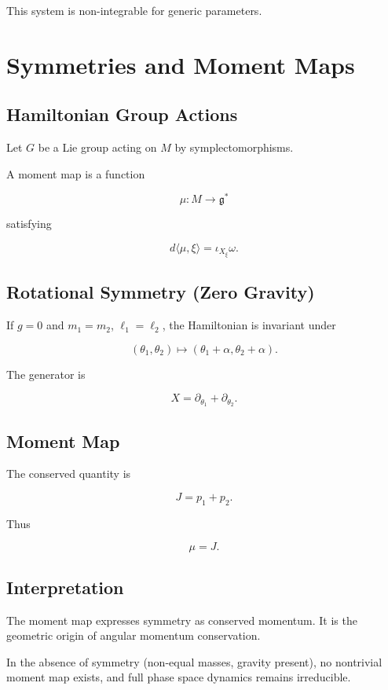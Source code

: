 \documentclass[11pt]{book}
\begin{document}
This system is non-integrable for generic parameters.

\chapter{Symmetries and Moment Maps}

\section{Hamiltonian Group Actions}

Let $G$ be a Lie group acting on $M$
by symplectomorphisms.

A moment map is a function

\[
\mu : M \to \mathfrak{g}^*
\]

satisfying

\[
d\langle \mu,\xi\rangle
=
\iota_{X_\xi}\omega.
\]

\section{Rotational Symmetry (Zero Gravity)}

If $g=0$ and $m_1=m_2$, $\ell_1=\ell_2$,
the Hamiltonian is invariant under

\[
(\theta_1,\theta_2)
\mapsto
(\theta_1+\alpha,\theta_2+\alpha).
\]

The generator is

\[
X = \partial_{\theta_1}+\partial_{\theta_2}.
\]

\section{Moment Map}

The conserved quantity is

\[
J = p_1 + p_2.
\]

Thus

\[
\mu = J.
\]

\section{Interpretation}

The moment map expresses symmetry
as conserved momentum.
It is the geometric origin of angular momentum conservation.

In the absence of symmetry (non-equal masses, gravity present),
no nontrivial moment map exists,
and full phase space dynamics remains irreducible.
\end{document}
